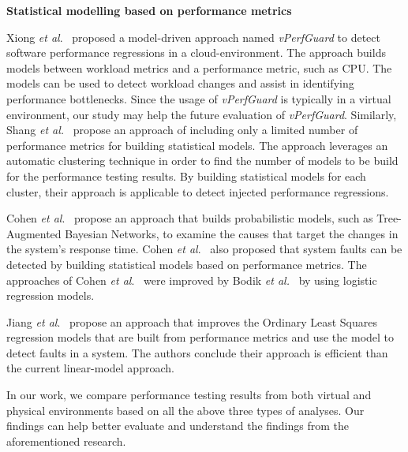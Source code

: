 \noindent \textbf{Statistical modelling based on performance metrics}

Xiong \textit{et al$.$}~\cite{xiong2013vperfguard} proposed a model-driven approach named \textit{vPerfGuard} to detect software performance regressions in a cloud-environment. The approach builds models between workload metrics and a performance metric, such as CPU. The models can be used to detect workload changes and assist in identifying performance bottlenecks. Since the usage of \emph{vPerfGuard} is typically in a virtual environment, our study may help the future evaluation of \textit{vPerfGuard}. Similarly, Shang\textit{ et al.}~\cite{Shang:2015:ADP:2668930.2688052} propose an approach of including only a limited number of performance metrics for building statistical models. The approach leverages an automatic clustering technique in order to find the number of models to be build for the performance testing results. By building statistical models for each cluster, their approach is applicable to detect injected performance regressions. %


Cohen \textit{et al$.$}~\cite{cohen2004correlating} propose an approach that builds probabilistic models, such as Tree-Augmented Bayesian Networks, to examine the causes that target the changes in the system's response time. Cohen \textit{et al$.$}~\cite{Cohen:2005:CIC:1095810.1095821} also proposed that system faults can be detected by building statistical models based on performance metrics. The approaches of Cohen \textit{et al$.$}~\cite{cohen2004correlating, Cohen:2005:CIC:1095810.1095821} were improved by Bodik \textit{et al.}~\cite{bodik2008hilighter} by using logistic regression models.

Jiang \emph{et al$.$}~\cite{Jiang:2009:SMM:1555228.1555233} propose an approach that improves the Ordinary Least Squares regression models that are built from performance metrics and use the model to detect faults in a system. The authors conclude their approach is efficient than the current linear-model approach.

In our work, we compare performance testing results from both virtual and physical environments based on all the above three types of analyses. Our findings can help better evaluate and understand the findings from the aforementioned research. 



